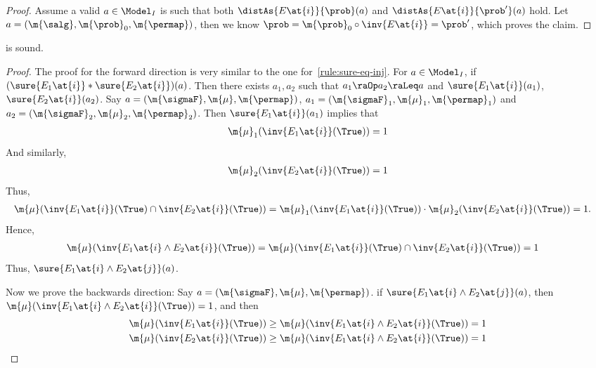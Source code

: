 \begin{proof}
  Assume a valid $a\in\Model_I$ is such that both
  $ \distAs{E\at{i}}{\prob }(a) $ and
  $ \distAs{E\at{i}}{\prob'}(a) $
  hold.
  Let $ a = (\m{\salg}, \m{\prob}_0,\m{\permap}) $,
  then we know
  $ \prob = \m{\prob}_0 \circ \inv{E\at{i}} = \prob'$,
  which proves the claim.
\end{proof}
 \begin{lemma}
\label{proof:sure-merge}
   is sound.
\end{lemma}

\begin{proof}
  The proof for the forward direction is very similar to
  the one for~\cref{rule:sure-eq-inj}.
  For $a \in \Model_I$,
  if $(\sure{E_1\at{i}} \ast \sure{E_2 \at{i}})(a)$.
  Then there exists
  $a_1, a_2$ such that $a_1 \raOp a_2 \raLeq a$ and
  $\sure{E_1 \at{i}}(a_1)$,
  $\sure{E_2 \at{i}}(a_2)$.
  Say $a = (\m{\sigmaF}, \m{\mu}, \m{\permap})$,
  $a_1 = (\m{\sigmaF}_1, \m{\mu}_1, \m{\permap}_1)$
  and $a_2 = (\m{\sigmaF}_2, \m{\mu}_2, \m{\permap}_2)$.
  Then $\sure{E_1\at{i}}(a_1)$ implies that
  \begin{align*}
    \m{\mu}_1 (\inv{E_1\at{i}}(\True)) = 1
  \end{align*}
  And similarly,
  \begin{align*}
    \m{\mu}_2 (\inv{E_2\at{i} }(\True)) = 1
  \end{align*}
  Thus,
  \begin{align*}
    \m{\mu} (\inv{E_1\at{i}}(\True) \cap \inv{E_2\at{i}}(\True) )
    &= \m{\mu}_1 (\inv{E_1\at{i}}(\True))  \cdot \m{\mu}_2 (\inv{E_2\at{i}}(\True))
     = 1.
  \end{align*}
  Hence,
  \begin{align*}
    \m{\mu} (\inv{E_1\at{i} \land E_2\at{i}}(\True) )
    &= \m{\mu} (\inv{E_1\at{i}}(\True) \cap \inv{E_2\at{i}}(\True)) = 1
  \end{align*}
  Thus, $\sure{E_1\at{i} \land E_2\at{j}} (a)$.

  Now we prove the backwards direction:
  Say $a = (\m{\sigmaF}, \m{\mu}, \m{\permap})$.
  if  $\sure{E_1\at{i} \land E_2\at{j}} (a)$,
  then $\m{\mu} (\inv{E_1\at{i} \land E_2\at{i}}(\True)) = 1$,
  and then
  \begin{align*}
    \m{\mu} (\inv{E_1\at{i}}(\True))  &\geq \m{\mu} (\inv{E_1\at{i} \land E_2\at{i}}(\True)) = 1 \\
    \m{\mu} (\inv{E_2\at{i}}(\True))  &\geq \m{\mu} (\inv{E_1\at{i} \land E_2\at{i}}(\True)) = 1
  \end{align*}


\end{proof}
